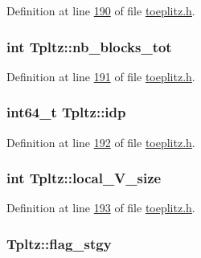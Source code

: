 Definition at line \hyperlink{toeplitz_8h_source_l00190}{190} of file \hyperlink{toeplitz_8h_source}{toeplitz.\-h}.

\hypertarget{structTpltz_a6275c3f32f3d790d92a7c8f257d3dcf9}{
\subsubsection[{nb\-\_\-blocks\-\_\-tot}]{\setlength{\rightskip}{0pt plus 5cm}int Tpltz\-::nb\-\_\-blocks\-\_\-tot}}\label{structTpltz_a6275c3f32f3d790d92a7c8f257d3dcf9}


Definition at line \hyperlink{toeplitz_8h_source_l00191}{191} of file \hyperlink{toeplitz_8h_source}{toeplitz.\-h}.

\hypertarget{structTpltz_af669b52bd5c07d8e41b4dddfc8c62312}{
\subsubsection[{idp}]{\setlength{\rightskip}{0pt plus 5cm}int64\-\_\-t Tpltz\-::idp}}\label{structTpltz_af669b52bd5c07d8e41b4dddfc8c62312}


Definition at line \hyperlink{toeplitz_8h_source_l00192}{192} of file \hyperlink{toeplitz_8h_source}{toeplitz.\-h}.

\hypertarget{structTpltz_a03c363fb09ce439bcbbe0fd1f419ff3a}{
\subsubsection[{local\-\_\-\-V\-\_\-size}]{\setlength{\rightskip}{0pt plus 5cm}int Tpltz\-::local\-\_\-\-V\-\_\-size}}\label{structTpltz_a03c363fb09ce439bcbbe0fd1f419ff3a}


Definition at line \hyperlink{toeplitz_8h_source_l00193}{193} of file \hyperlink{toeplitz_8h_source}{toeplitz.\-h}.

\hypertarget{structTpltz_af136a7cb103383ffab2080c566b8c7ab}{
\subsubsection[{flag\-\_\-stgy}]{ Tpltz\-::flag\-\_\-stgy}}\label{structTpltz_af136a7cb103383ffab2080c566b8c7ab}


